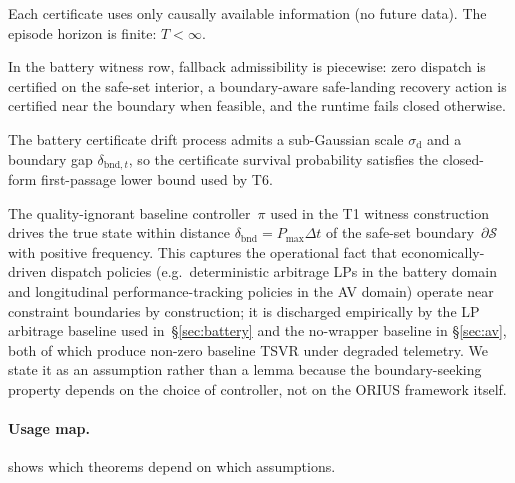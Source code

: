 \begin{assumption}\label{ass:A7}
Each certificate uses only causally available information (no future data).
The episode horizon is finite: $T < \infty$.
\end{assumption}

\begin{assumption}\label{ass:A8}
In the battery witness row, fallback admissibility is piecewise: zero dispatch is
certified on the safe-set interior, a boundary-aware safe-landing recovery action
is certified near the boundary when feasible, and the runtime fails closed
otherwise.
\end{assumption}

\begin{assumption}\label{ass:A9}
The battery certificate drift process admits a sub-Gaussian scale
$\sigma_{\mathrm{d}}$ and a boundary gap $\delta_{\mathrm{bnd},t}$, so the
certificate survival probability satisfies the closed-form first-passage lower
bound used by T6.
\end{assumption}

\begin{assumption}\label{ass:A10}
The quality-ignorant baseline controller~$\pi$ used in the T1 witness construction
drives the true state within distance $\delta_{\mathrm{bnd}} = P_{\max}\Delta t$
of the safe-set boundary~$\partial\mathcal{S}$ with positive frequency.  This
captures the operational fact that economically-driven dispatch policies (e.g.\
deterministic arbitrage LPs in the battery domain and longitudinal
performance-tracking policies in the AV domain) operate near constraint
boundaries by construction; it is discharged empirically by the LP arbitrage
baseline used in~\S\ref{sec:battery} and the no-wrapper baseline in
\S\ref{sec:av}, both of which produce non-zero baseline TSVR under degraded
telemetry.  We state it as an assumption rather than a lemma because the
boundary-seeking property depends on the choice of controller, not on the
ORIUS framework itself.
\end{assumption}

\paragraph{Usage map.}   shows which theorems depend on
which assumptions.

